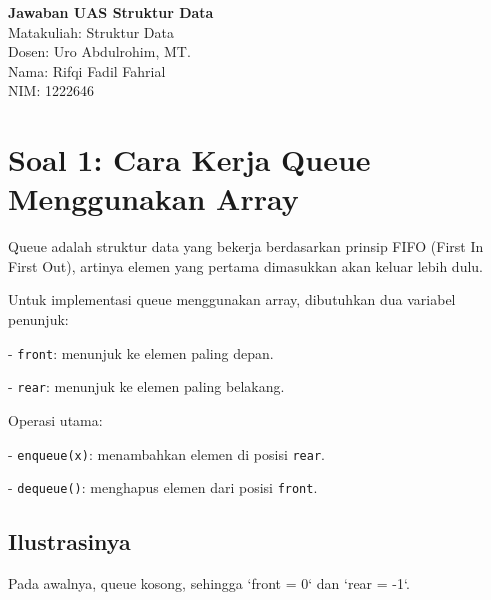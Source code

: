 \documentclass[12pt,a4paper]{article}
\begin{document}
\begin{center}
    {\Large \textbf{Jawaban UAS Struktur Data}} \\
    \vspace{0.5cm}
    Matakuliah: Struktur Data \\
    Dosen: Uro Abdulrohim, MT. \\
    \vspace{0.5cm}
    Nama: Rifqi Fadil Fahrial\\
    NIM: 1222646
\end{center}

\vspace{1cm}

\section{Soal 1: Cara Kerja Queue Menggunakan Array}

Queue adalah struktur data yang bekerja berdasarkan prinsip FIFO (First In First Out), artinya elemen yang pertama dimasukkan akan keluar lebih dulu.

Untuk implementasi queue menggunakan array, dibutuhkan dua variabel penunjuk:

    
- \texttt{front}: menunjuk ke elemen paling depan.
    
- \texttt{rear}: menunjuk ke elemen paling belakang.


Operasi utama:
    
- \texttt{enqueue(x)}: menambahkan elemen di posisi \texttt{rear}.
    
- \texttt{dequeue()}: menghapus elemen dari posisi \texttt{front}.

\subsection{Ilustrasinya}

Pada awalnya, queue kosong, sehingga `front = 0` dan `rear = -1`.
\end{document}
